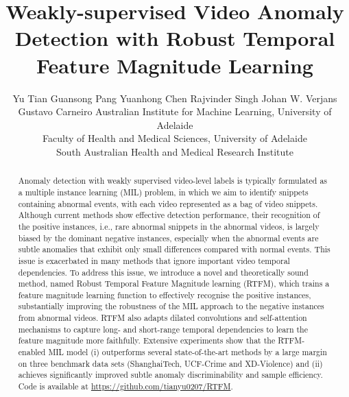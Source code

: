 \documentclass[final]{cvpr}
\begin{document}
\title{Weakly-supervised Video Anomaly Detection with Robust Temporal Feature Magnitude Learning} 

\author{\parbox{0.7\linewidth}{\centering Yu Tian      Guansong Pang  Yuanhong Chen     Rajvinder Singh  Johan W. Verjans   Gustavo Carneiro    Australian Institute for Machine Learning, University of Adelaide \\
  Faculty of Health and Medical Sciences, University of Adelaide
 \\
   South Australian Health and Medical Research Institute \\
} 
}

\maketitle




\begin{abstract}
Anomaly detection with weakly supervised video-level labels is typically formulated as a multiple instance learning (MIL) problem, in which we aim to identify snippets containing abnormal events, with each video represented as a bag of video snippets. 
Although current methods show effective detection performance, their recognition of the positive instances, i.e., rare abnormal snippets in the abnormal videos, is largely biased by the dominant negative instances, especially when the abnormal events are subtle anomalies that exhibit only small differences compared with normal events.
This issue is exacerbated in many methods that ignore important video temporal dependencies. To address this issue, we introduce a novel and theoretically sound method, named Robust Temporal Feature Magnitude learning (RTFM), which trains a feature magnitude learning function to effectively recognise the positive instances, substantially improving the robustness of the MIL approach to the negative instances from abnormal videos. RTFM also adapts dilated convolutions and self-attention mechanisms to capture long- and short-range temporal dependencies to learn the feature magnitude more faithfully. 
Extensive experiments show that the RTFM-enabled MIL model (i) outperforms several state-of-the-art methods by a large margin on three benchmark data sets (ShanghaiTech, UCF-Crime and XD-Violence) and (ii) achieves significantly improved subtle anomaly discriminability and sample efficiency. Code is available at \url{https://github.com/tianyu0207/RTFM}.

\end{abstract}
\end{document}
